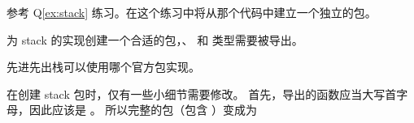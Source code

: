 \begin{Exercise}[title={stack 包},difficulty=2]
\label{ex:stack-package}
\Question\label{ex:stack-package q1} 
参考 Q\ref{ex:stack} 练习。在这个练习中将从那个代码中建立一个独立的包。

为 stack 的实现创建一个合适的包，、 和  类型需要被导出。

\Question\label{ex:stack-package q2} 先进先出栈可以使用哪个官方包实现。

\end{Exercise}

\begin{Answer}
\Question 在创建 stack 包时，仅有一些小细节需要修改。
首先，导出的函数应当大写首字母，因此应该是 。
所以完整的包（包含 ）变成为


\end{Answer}
